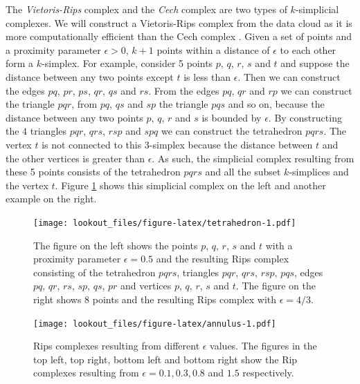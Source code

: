 \documentclass[11pt,a4paper,]{article}
\theoremstyle{definition}
\theoremstyle{definition}
\theoremstyle{definition}
\theoremstyle{remark}
\begin{document}
The \emph{Vietoris-Rips} complex and the \emph{Cech} complex are two types of \(k\)-simplicial complexes. We will construct a Vietoris-Rips complex from the data cloud as it is more computationally efficient than the Cech complex \autocite{ghrist2008barcodes}. Given a set of points and a proximity parameter \(\epsilon > 0\), \(k+1\) points within a distance of \(\epsilon\) to each other form a \(k\)-simplex. For example, consider 5 points \(p\), \(q\), \(r\), \(s\) and \(t\) and suppose the distance between any two points except \(t\) is less than \(\epsilon\). Then we can construct the edges \(pq\), \(pr\), \(ps\), \(qr\), \(qs\) and \(rs\). From the edges \(pq\), \(qr\) and \(rp\) we can construct the triangle \(pqr\), from \(pq\), \(qs\) and \(sp\) the triangle \(pqs\) and so on, because the distance between any two points \(p\), \(q\), \(r\) and \(s\) is bounded by \(\epsilon\). By constructing the \(4\) triangles \(pqr\), \(qrs\), \(rsp\) and \(spq\) we can construct the tetrahedron \(pqrs\). The vertex \(t\) is not connected to this \(3\)-simplex because the distance between \(t\) and the other vertices is greater than \(\epsilon\). As such, the simplicial complex resulting from these 5 points consists of the tetrahedron \(pqrs\) and all the subset \(k\)-simplices and the vertex \(t\). Figure \ref{fig:tetrahedron} shows this simplicial complex on the left and another example on the right.

\begin{figure}
\centering
\texttt{[image: lookout\_files/figure-latex/tetrahedron-1.pdf]}
\caption{\label{fig:tetrahedron}The figure on the left shows the points \(p\), \(q\), \(r\), \(s\) and \(t\) with a proximity parameter \(\epsilon = 0.5\) and the resulting Rips complex consisting of the tetrahedron \(pqrs\), triangles \(pqr\), \(qrs\), \(rsp\), \(pqs\), edges \(pq\), \(qr\), \(rs\), \(sp\), \(qs\), \(pr\) and vertices \(p\), \(q\), \(r\), \(s\) and \(t\). The figure on the right shows \(8\) points and the resulting Rips complex with \(\epsilon=4/3\).}
\end{figure}

\begin{figure}
\centering
\texttt{[image: lookout\_files/figure-latex/annulus-1.pdf]}
\caption{\label{fig:annulus}Rips complexes resulting from different \(\epsilon\) values. The figures in the top left, top right, bottom left and bottom right show the Rip complexes resulting from \(\epsilon = 0.1, 0.3, 0.8\) and \(1.5\) respectively.}
\end{figure}
\end{document}
